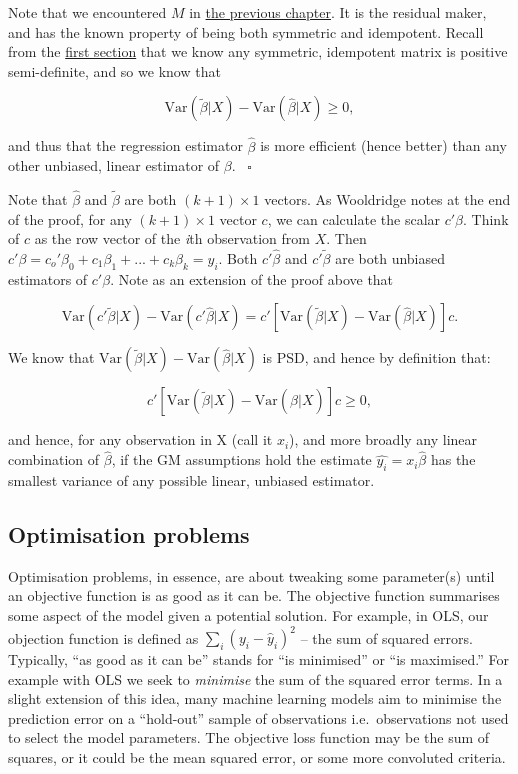 \documentclass[
]{book}
\begin{document}
Note that we encountered \(M\) in \protect\hyperlink{frisch}{the previous chapter}. It is the residual maker, and has the known property of being both symmetric and idempotent. Recall from the \protect\hyperlink{pd_terms}{first section} that we know any symmetric, idempotent matrix is positive semi-definite, and so we know that

\[
\text{Var}(\tilde{\beta}|X) - \text{Var}(\hat{\beta}|X) \geq 0,
\]

and thus that the regression estimator \(\hat{\beta}\) is more efficient (hence better) than any other unbiased, linear estimator of \(\beta. \;\;\; \square\)

Note that \(\hat{\beta}\) and \(\tilde{\beta}\) are both \((k+1) \times 1\) vectors. As Wooldridge notes at the end of the proof, for any \((k+1) \times 1\) vector \(c\), we can calculate the scalar \(c'\beta\). Think of \(c\) as the row vector of the \emph{i}th observation from \(X\). Then \(c'\beta = c_o'\beta_0 + c_1\beta_1+...+c_k\beta_k = y_i\). Both \(c'\hat{\beta}\) and \(c'\tilde{\beta}\) are both unbiased estimators of \(c'\beta\). Note as an extension of the proof above that

\[
\text{Var}(c'\tilde{\beta}|X) - \text{Var}(c'\hat{\beta}|X) = c'[\text{Var}(\tilde{\beta}|X) - \text{Var}(\hat{\beta}|X)]c.
\]

We know that \(\text{Var}(\tilde{\beta}|X) - \text{Var}(\hat{\beta}|X)\) is PSD, and hence by definition that:

\[
c'[\text{Var}(\tilde{\beta}|X) - \text{Var}(\hat{\beta}|X)]c \geq 0,
\]

and hence, for any observation in X (call it \(x_i\)), and more broadly any linear combination of \(\hat{\beta}\), if the GM assumptions hold the estimate \(\hat{y_i} = x_i\hat{\beta}\) has the smallest variance of any possible linear, unbiased estimator.

\hypertarget{optimisation-problems}{%
\subsection{Optimisation problems}\label{optimisation-problems}}

Optimisation problems, in essence, are about tweaking some parameter(s) until an objective function is as good as it can be. The objective function summarises some aspect of the model given a potential solution. For example, in OLS, our objection function is defined as \(\sum_i(y_i-\hat{y}_i)^2\) -- the sum of squared errors. Typically, ``as good as it can be'' stands for ``is minimised'' or ``is maximised.'' For example with OLS we seek to \emph{minimise} the sum of the squared error terms. In a slight extension of this idea, many machine learning models aim to minimise the prediction error on a ``hold-out'' sample of observations i.e.~observations not used to select the model parameters. The objective loss function may be the sum of squares, or it could be the mean squared error, or some more convoluted criteria.
\end{document}
